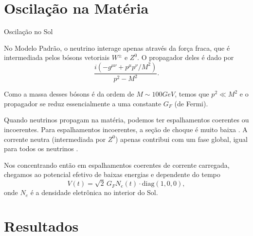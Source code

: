 \documentclass[aspectratio=169]{beamer}
\begin{document}
\section{Oscilação na Matéria}

\begin{frame}{Oscilação no Sol}

No Modelo Padrão, o neutrino interage apenas através da força fraca, que é intermediada pelos bósons vetoriais $W^\pm$ e $Z^0$. O propagador deles é dado por \cite{halzen}
\begin{equation} \label{eq:boson-propagator}
\frac{i (- g^{\mu \nu} + p^{\mu} p^{\nu} / M^2)}{p^2 - M^2}.
\end{equation}

Como a massa desses bósons é da ordem de $M \sim 100 \unit{GeV}$, temos que $p^2 \ll M^2$ e o propagador se reduz essencialmente a uma constante $G_F$ (de Fermi).

\n

Quando neutrinos propagam na matéria, podemos ter espalhamentos coerentes ou incoerentes. Para espalhamentos incoerentes, a seção de choque é muito baixa \cite{gonzalez}. A corrente neutra (intermediada por $Z^0$) apenas contribui com um fase global, igual para todos os neutrinos \cite{gonzalez}.

\n

Nos concentrando então em espalhamentos coerentes de corrente carregada, chegamos ao potencial efetivo de baixas energias e dependente do tempo
\begin{equation} \label{eq:eff-pot}
V(t) = \sqrt{2} \, G_F N_e(t) \cdot \text{diag}(1, 0, 0),
\end{equation}
onde $N_e$ é a densidade eletrônica no interior do Sol.

\end{frame}

\section{Resultados}
\end{document}
